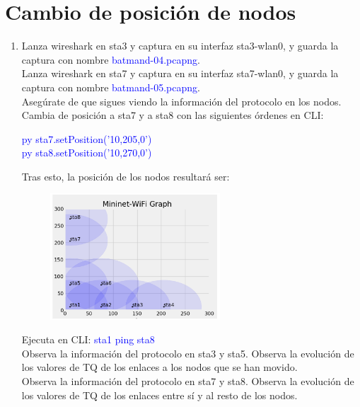 \documentclass[12pt, a4paper]{report}
\begin{document}
\chapter{Cambio de posición de nodos}
\begin{enumerate}
	\item Lanza wireshark en sta3 y captura en su interfaz sta3-wlan0, y guarda la captura con nombre
	\textcolor{blue}{batmand-04.pcapng}.\\
	
	Lanza wireshark en sta7 y captura en su interfaz sta7-wlan0, y guarda la captura con nombre
	\textcolor{blue}{batmand-05.pcapng}.\\
	
	Asegúrate de que sigues viendo la información del protocolo en los nodos.\\
	
	Cambia de posición a sta7 y a sta8 con las siguientes órdenes en CLI:
	\begin{center}
		\textcolor{blue}{py sta7.setPosition('10,205,0')}\\
		\textcolor{blue}{py sta8.setPosition('10,270,0')}
	\end{center}
	Tras esto, la posición de los nodos resultará ser:
	\begin{figure}[H]
		\centering
		\includegraphics[width=0.6\textwidth]{enunciado5}
	\end{figure}
	Ejecuta en CLI: \textcolor{blue}{sta1 ping sta8}\\
	
	Observa la información del protocolo en sta3 y sta5. Observa la evolución de los valores de TQ
	de los enlaces a los nodos que se han movido.\\
	
	Observa la información del protocolo en sta7 y sta8. Observa la evolución de los valores de TQ
	de los enlaces entre sí y al resto de los nodos.\\
	

\end{enumerate}
\end{document}
